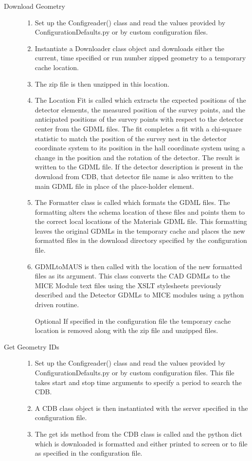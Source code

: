 \begin{description}
  \item[Download Geometry] \hfill
  \begin{enumerate}
   \item Set up the Configreader() class and read the values provided
   by ConfigurationDefaults.py or by custom configuration files.
   \item Instantiate a Downloader class object and downloads either
the current, time specified or run number zipped geometry to a
temporary cache location.
   \item The zip file is then unzipped in this location.
   \item The Location Fit is called which extracts the expected
   positions of the detector elements, the measured position of the
   survey points, and the anticipated positions of the survey points
   with respect to the detector center from the GDML files. The fit
   completes a fit with a chi-square statistic to match the position
   of the survey nest in the detector coordinate system to its
   position in the hall coordinate system using a change in the
   position and the rotation of the detector. The result is written to
   the GDML file. If the detector description is present in the
   download from CDB, that detector file name is also written to the
   main GDML file in place of the place-holder element.
   \item The Formatter class is called which formats the GDML
files. The formatting alters the schema location of these files and
points them to the correct local locations of the Materials GDML
file. This formatting leaves the original GDMLs in the temporary cache
and places the new formatted files in the download directory specified
by the configuration file.
   \item GDMLtoMAUS is then called with the location of the new
formatted files as its argument. This class converts the CAD GDMLs to
the MICE Module text files using the XSLT stylesheets previously
described and the Detector GDMLs to MICE modules using a python driven
routine.
   \item[Optional] If specified in the configuration file the
   temporary cache location is removed along with the zip file and
   unzipped files.
  \end{enumerate}

  \item[Get Geometry IDs]
  \begin{enumerate}
   \item Set up the Configreader() class and read the values provided
by ConfigurationDefaults.py or by custom configuration files. This
file takes start and stop time arguments to specify a period to search
the CDB.
   \item A CDB class object is then instantiated with the server
   specified in the configuration file.
   \item The get ids method from the CDB class is called and the
python dict which is downloaded is formatted and either printed to
screen or to file as specified in the configuration file.
  \end{enumerate}
\end{description}

